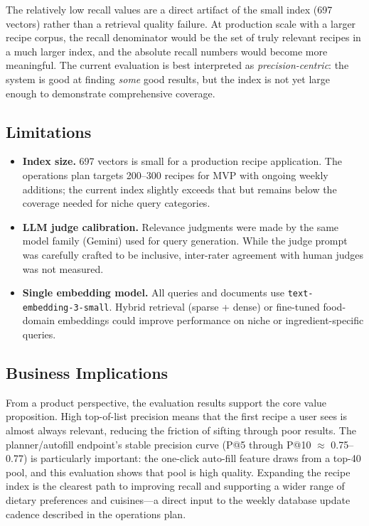 \documentclass[12pt,letterpaper]{article}
\begin{document}
The relatively low recall values are a direct artifact of the small index (697 vectors) rather
than a retrieval quality failure. At production scale with a larger recipe corpus, the recall
denominator would be the set of truly relevant recipes in a much larger index, and the
absolute recall numbers would become more meaningful. The current evaluation is best
interpreted as \textit{precision-centric}: the system is good at finding \textit{some}
good results, but the index is not yet large enough to demonstrate comprehensive coverage.

\subsection{Limitations}

\begin{itemize}[itemsep=2pt]
  \item \textbf{Index size.} 697 vectors is small for a production recipe application.
    The operations plan targets 200--300 recipes for MVP with ongoing weekly additions;
    the current index slightly exceeds that but remains below the coverage needed for
    niche query categories.

  \item \textbf{LLM judge calibration.} Relevance judgments were made by the same
    model family (Gemini) used for query generation. While the judge prompt was
    carefully crafted to be inclusive, inter-rater agreement with human judges was not
    measured.

  \item \textbf{Single embedding model.} All queries and documents use
    \texttt{text-embedding-3-small}. Hybrid retrieval (sparse + dense) or fine-tuned
    food-domain embeddings could improve performance on niche or ingredient-specific
    queries.
\end{itemize}

\subsection{Business Implications}

From a product perspective, the evaluation results support the core value proposition.
High top-of-list precision means that the first recipe a user sees is almost always relevant,
reducing the friction of sifting through poor results. The planner/autofill endpoint's stable
precision curve (P@5 through P@10 $\approx$ 0.75--0.77) is particularly important: the
one-click auto-fill feature draws from a top-40 pool, and this evaluation shows that pool
is high quality. Expanding the recipe index is the clearest path to improving recall and
supporting a wider range of dietary preferences and cuisines---a direct input to the weekly
database update cadence described in the operations plan.
\end{document}

